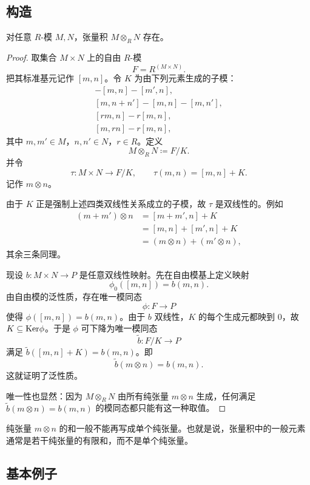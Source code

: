 \subsection{构造}

\begin{theorem}
对任意 $R$-模 $M,N$，张量积 $M\otimes_R N$ 存在。
\end{theorem}

\begin{proof}
取集合 $M\times N$ 上的自由 $R$-模
\[
F=R^{(M\times N)}.
\]
把其标准基元记作 $[m,n]$。令 $K$ 为由下列元素生成的子模：
\begin{align*}
[m+m',n]-[m,n]-[m',n],\\
[m,n+n']-[m,n]-[m,n'],\\
[rm,n]-r[m,n],\\
[m,rn]-r[m,n],
\end{align*}
其中 $m,m'\in M$，$n,n'\in N$，$r\in R$。定义
\[
M\otimes_R N\coloneqq F/K.
\]
并令
\[
\tau\colon M\times N\to F/K,
\qquad
\tau(m,n)=[m,n]+K.
\]
记作 $m\otimes n$。

由于 $K$ 正是强制上述四类双线性关系成立的子模，故 $\tau$ 是双线性的。例如
\begin{align*}
(m+m')\otimes n
&=[m+m',n]+K\\
&=[m,n]+[m',n]+K\\
&=(m\otimes n)+(m'\otimes n),
\end{align*}
其余三条同理。

现设 $b\colon M\times N\to P$ 是任意双线性映射。先在自由模基上定义映射
\[
\phi_0([m,n])=b(m,n).
\]
由自由模的泛性质，存在唯一模同态
\[
\phi\colon F\to P
\]
使得 $\phi([m,n])=b(m,n)$。由于 $b$ 双线性，$K$ 的每个生成元都映到 $0$，故 $K\subseteq \mathrm{Ker}\phi$。于是 $\phi$ 可下降为唯一模同态
\[
\widetilde b\colon F/K\to P
\]
满足 $\widetilde b([m,n]+K)=b(m,n)$。即
\[
\widetilde b(m\otimes n)=b(m,n).
\]
这就证明了泛性质。

唯一性也显然：因为 $M\otimes_R N$ 由所有纯张量 $m\otimes n$ 生成，任何满足 $\widetilde b(m\otimes n)=b(m,n)$ 的模同态都只能有这一种取值。
\end{proof}

\begin{remark}
纯张量 $m\otimes n$ 的和一般不能再写成单个纯张量。也就是说，张量积中的一般元素通常是若干纯张量的有限和，而不是单个纯张量。
\end{remark}

\subsection{基本例子}

